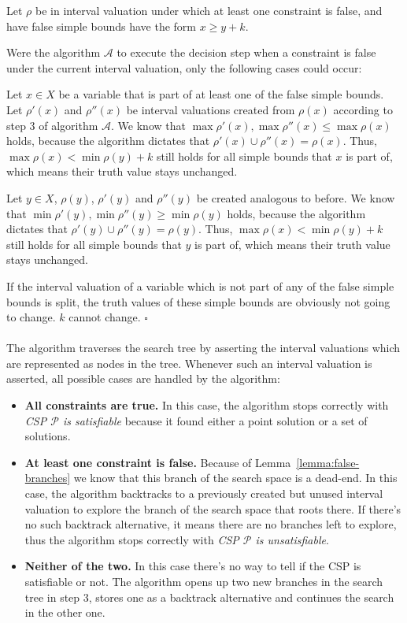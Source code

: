 Let $\rho$ be in interval valuation under which at least one constraint is false, and have false simple bounds have the form $x \geq y + k$.

Were the algorithm $\mathcal{A}$ to execute the decision step when a constraint is false under the current interval valuation, only the following cases could occur:

Let $x \in X$ be a variable that is part of at least one of the false simple bounds.
Let $\rho'(x)$ and $\rho''(x)$ be interval valuations created from $\rho(x)$ according to step 3 of algorithm $\mathcal{A}$.
We know that $\max \rho'(x), \max \rho''(x) \leq \max \rho(x)$ holds, because the algorithm dictates that $\rho'(x) \cup \rho''(x) = \rho(x)$.
Thus, $\max \rho(x) < \min \rho(y) + k$ still holds for all simple bounds that $x$ is part of, which means their truth value stays unchanged.

Let $y \in X$, $\rho(y)$, $\rho'(y)$ and $\rho''(y)$ be created analogous to before.
We know that $\min \rho'(y), \min \rho''(y) \geq \min \rho(y)$ holds, because the algorithm dictates that $\rho'(y) \cup \rho''(y) = \rho(y)$.
Thus, $\max \rho(x) < \min \rho(y) + k$ still holds for all simple bounds that $y$ is part of, which means their truth value stays unchanged.

If the interval valuation of a variable which is not part of any of the false simple bounds is split, the truth values of these simple bounds are obviously not going to change. $k$ cannot change. $\square$


\paragraph{}
The algorithm traverses the search tree by asserting the interval valuations which are represented as nodes in the tree.
Whenever such an interval valuation is asserted, all possible cases are handled by the algorithm:

\begin{itemize}
    \item
        \textbf{All constraints are true.}
        In this case, the algorithm stops correctly with \emph{CSP $\mathcal{P}$ is satisfiable} because it found either a point solution or a set of solutions.
    
    \item
        \textbf{At least one constraint is false.}
        Because of Lemma~\ref{lemma:false-branches} we know that this branch of the search space is a dead-end.
        In this case, the algorithm backtracks to a previously created but unused interval valuation to explore the branch of the search space that roots there.
        If there's no such backtrack alternative, it means there are no branches left to explore, thus the algorithm stops correctly with \emph{CSP $\mathcal{P}$ is unsatisfiable}.
    \item
        \textbf{Neither of the two.}
        In this case there's no way to tell if the CSP is satisfiable or not.
        The algorithm opens up two new branches in the search tree in step 3, stores one as a backtrack alternative and continues the search in the other one.
\end{itemize}

